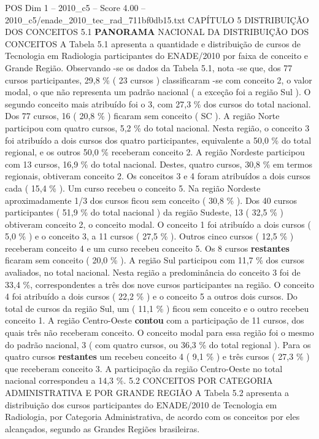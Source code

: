 \begin{textsample}{POS Dim 1 – 2010\_c5 – Score 4.00 – 2010\_c5/enade\_2010\_tec\_rad\_711bf0db15.txt}  \label{ex:f1_pos_137}
CAPÍTULO 5 DISTRIBUIÇÃO DOS CONCEITOS 5.1 \textbf{PANORAMA} NACIONAL DA DISTRIBUIÇÃO DOS CONCEITOS A Tabela 5.1 apresenta a quantidade e distribuição de cursos de Tecnologia em Radiologia participantes do ENADE/2010 por faixa de conceito e Grande Região.
Observando -se os dados da Tabela 5.1, nota -se que, dos 77 cursos participantes, 29,8 \% ( 23 cursos ) classificaram -se com conceito 2, o valor modal, o que não representa um padrão nacional ( a exceção foi a região Sul ).
O segundo conceito mais atribuído foi o 3, com 27,3 \% dos cursos do total nacional.
Dos 77 cursos, 16 ( 20,8 \% ) ficaram sem conceito ( SC ).
A região Norte participou com quatro cursos, 5,2 \% do total nacional.
Nesta região, o conceito 3 foi atribuído a dois cursos dos quatro participantes, equivalente a 50,0 \% do total regional, e os outros 50,0 \% receberam conceito 2.
A região Nordeste participou com 13 cursos, 16,9 \% do total nacional.
Destes, quatro cursos, 30,8 \% em termos regionais, obtiveram conceito 2.
Os conceitos 3 e 4 foram atribuídos a dois cursos cada ( 15,4 \% ).
Um curso recebeu o conceito 5.
Na região Nordeste aproximadamente 1/3 dos cursos ficou sem conceito ( 30,8 \% ).
Dos 40 cursos participantes ( 51,9 \% do total nacional ) da região Sudeste, 13 ( 32,5 \% ) obtiveram conceito 2, o conceito modal.
O conceito 1 foi atribuído a dois cursos ( 5,0 \% ) e o conceito 3, a 11 cursos ( 27,5 \% ).
Outros cinco cursos ( 12,5 \% ) receberam conceito 4 e um curso recebeu conceito 5.
Os 8 cursos \textbf{restantes} ficaram sem conceito ( 20,0 \% ).
A região Sul participou com 11,7 \% dos cursos avaliados, no total nacional.
Nesta região a predominância do conceito 3 foi de 33,4 \%, correspondentes a três dos nove cursos participantes na região.
O conceito 4 foi atribuído a dois cursos ( 22,2 \% ) e o conceito 5 a outros dois cursos.
Do total de cursos da região Sul, um ( 11,1 \% ) ficou sem conceito e o outro recebeu conceito 1.
A região Centro-Oeste \textbf{contou} com a participação de 11 cursos, dos quais três não receberam conceito.
O conceito modal para essa região foi o mesmo do padrão nacional, 3 ( com quatro cursos, ou 36,3 \% do total regional ).
Para os quatro cursos \textbf{restantes} um recebeu conceito 4 ( 9,1 \% ) e três cursos ( 27,3 \% ) que receberam conceito 3.
A participação da região Centro-Oeste no total nacional correspondeu a 14,3 \%. 5.2 CONCEITOS POR CATEGORIA ADMINISTRATIVA E POR GRANDE REGIÃO A Tabela 5.2 apresenta a distribuição dos cursos participantes do ENADE/2010 de Tecnologia em Radiologia, por Categoria Administrativa, de acordo com os conceitos por eles alcançados, segundo as Grandes Regiões brasileiras.

\end{textsample}

